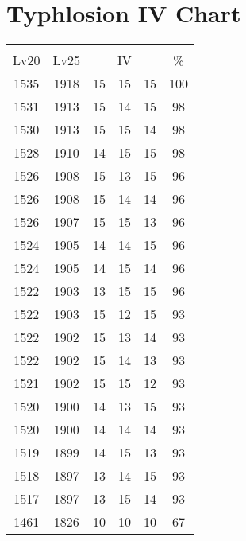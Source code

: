 \documentclass{article}%
\begin{document}
%
\normalsize%
\section{Typhlosion IV Chart}%
\label{sec:Typhlosion IV Chart}%
\renewcommand{\arraystretch}{1.5}%
\begin{tabular}{|c|c|c|c|c|c|}%
\hline%
\multicolumn{6}{|c|}{\textcolor{white}{ 
\linebreak{Typhlosion}
}%
\cellcolor{black}}\\%
\multicolumn{1}{|c}{Lv20}&\multicolumn{1}{c|}{Lv25}&\multicolumn{3}{c|}{IV}&\multicolumn{1}{|c|}{\%}\\%
\hline%
\rowcolor{color100}%
1535&1918&15&15&15&100\\%
\hline%
\rowcolor{color98}%
1531&1913&15&14&15&98\\%
\hline%
\rowcolor{color98}%
1530&1913&15&15&14&98\\%
\hline%
\rowcolor{color98}%
1528&1910&14&15&15&98\\%
\hline%
\rowcolor{color96}%
1526&1908&15&13&15&96\\%
\hline%
\rowcolor{color96}%
1526&1908&15&14&14&96\\%
\hline%
\rowcolor{color96}%
1526&1907&15&15&13&96\\%
\hline%
\rowcolor{color96}%
1524&1905&14&14&15&96\\%
\hline%
\rowcolor{color96}%
1524&1905&14&15&14&96\\%
\hline%
\rowcolor{color96}%
1522&1903&13&15&15&96\\%
\hline%
\rowcolor{color93}%
1522&1903&15&12&15&93\\%
\hline%
\rowcolor{color93}%
1522&1902&15&13&14&93\\%
\hline%
\rowcolor{color93}%
1522&1902&15&14&13&93\\%
\hline%
\rowcolor{color93}%
1521&1902&15&15&12&93\\%
\hline%
\rowcolor{color93}%
1520&1900&14&13&15&93\\%
\hline%
\rowcolor{color93}%
1520&1900&14&14&14&93\\%
\hline%
\rowcolor{color93}%
1519&1899&14&15&13&93\\%
\hline%
\rowcolor{color93}%
1518&1897&13&14&15&93\\%
\hline%
\rowcolor{color93}%
1517&1897&13&15&14&93\\%
\hline%
\rowcolor{color91}%
1461&1826&10&10&10&67\\%
\end{tabular}

%
\end{document}

